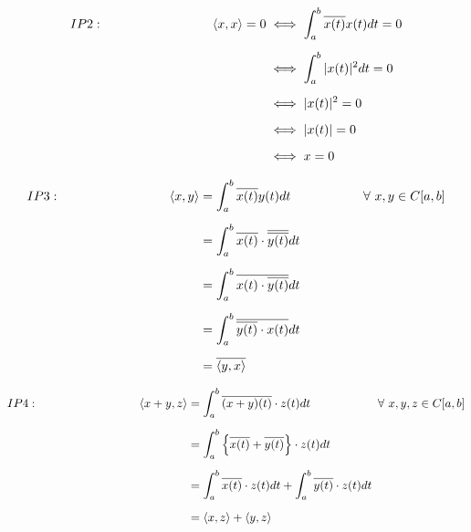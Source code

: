 \documentclass[12pt, a4paper]{article} %
\begin{document}
    \vspace*{0.3cm}
   \begin{center}
    \begin{equation*}
        \begin{split}
            IP2:\hspace*{3cm} \langle x, x \rangle = 0 & \iff \int_{a}^{b} \overline{x(t)} x(t) dt  = 0\\[2mm]
            & \iff \int_{a}^{b}|x(t)|^2 dt = 0\\[2mm]
            & \iff |x(t)|^2 = 0\\[2mm]
            & \iff |x(t)| = 0\\[2mm]
            & \iff x = 0
        \end{split}
   \end{equation*}
   \end{center}
   
    \pagebreak

    \begin{equation*}
        \begin{split}
            IP3:\hspace*{3cm} \langle x, y \rangle & = \int_{a}^{b}\overline{x(t)} y(t) dt \hspace*{2cm} \forall\ x,y\in C[a,b]\\[2mm]
            & = \int_{a}^{b} \overline{x(t)} \cdot \overline{\overline{y(t)}}dt \\[2mm]
            & = \int_{a}^{b} \overline{x(t) \cdot \overline{y(t)}} dt \\[2mm]
            & = \int_{a}^{b} \overline{\overline{y(t)} \cdot x(t)} dt \\[2mm]
            & = \overline{\langle y, x \rangle}
        \end{split}
    \end{equation*}


    \begin{equation*}
        \begin{split}
            IP4:\hspace*{3cm} \langle x + y, z \rangle & = \int_{a}^{b}\overline{(x + y)(t)}\cdot z(t) dt \hspace*{2cm} \forall\ x,y,z\in C[a,b]\\[2mm]
            & = \int_{a}^{b} \left\{\overline{x(t)} + \overline{y(t)} \right\}\cdot z(t) dt \\[2mm]
            & = \int_{a}^{b} \overline{x(t)} \cdot z(t) dt + \int_{a}^{b} \overline{y(t)} \cdot z(t) dt\\[2mm]
            & = \langle x, z \rangle + \langle y, z \rangle
        \end{split}
    \end{equation*}
\end{document}
